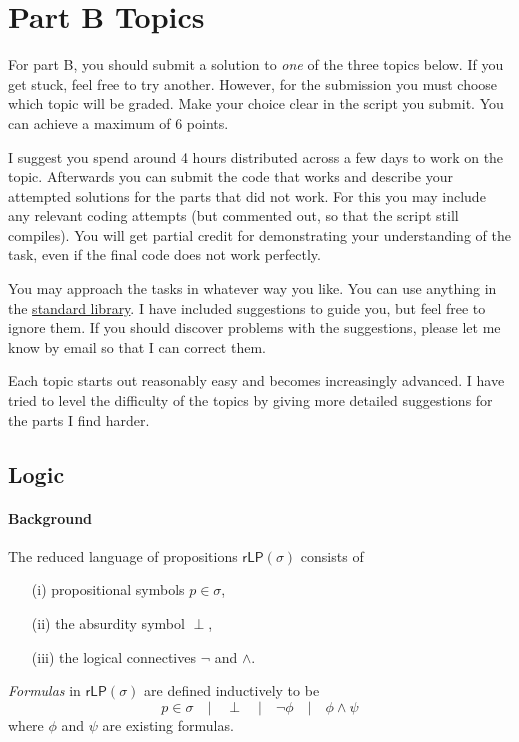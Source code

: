 \documentclass{article}[12pt]
\theoremstyle{definition}
\begin{document}
\section{Part B Topics}
For part B, you should submit a solution to \emph{one} of the three topics below. If you get stuck, feel free to try another. However, for the submission you must choose which topic will be graded. Make your choice clear in the script you submit. You can achieve a maximum of 6 points.

I suggest you spend around 4 hours distributed across a few days to work on the topic. Afterwards you can submit the code that works and describe your attempted solutions for the parts that did not work. For this you may include any relevant coding attempts (but commented out, so that the script still compiles). You will get partial credit for demonstrating your understanding of the task, even if the final code does not work perfectly.

You may approach the tasks in whatever way you like. You can use anything in the \href{https://hackage.haskell.org/package/base}{standard library}. I have included suggestions to guide you, but feel free to ignore them. If you should discover problems with the suggestions, please let me know by email so that I can correct them. 

Each topic starts out reasonably easy and becomes increasingly advanced. I have tried to level the difficulty of the topics by giving more detailed suggestions for the parts I find harder.

\subsection{Logic}
\noindent{}

\paragraph{Background} The reduced language of propositions $\mathsf{rLP}(\sigma)$ consists of
\begin{itemize}
    \item[(i)] propositional symbols $p \in \sigma$,
    \item[(ii)] the absurdity symbol $\perp$,
    \item[(iii)] the logical connectives $\neg$ and $\wedge$.
\end{itemize}
\emph{Formulas} in $\mathsf{rLP}(\sigma)$ are defined inductively to be 
$$ p \in \sigma \quad \vert \quad \perp \quad \vert \quad \neg \phi \quad \vert \quad \phi \wedge \psi $$
where $\phi$ and $\psi$ are existing formulas. 
\end{document}
